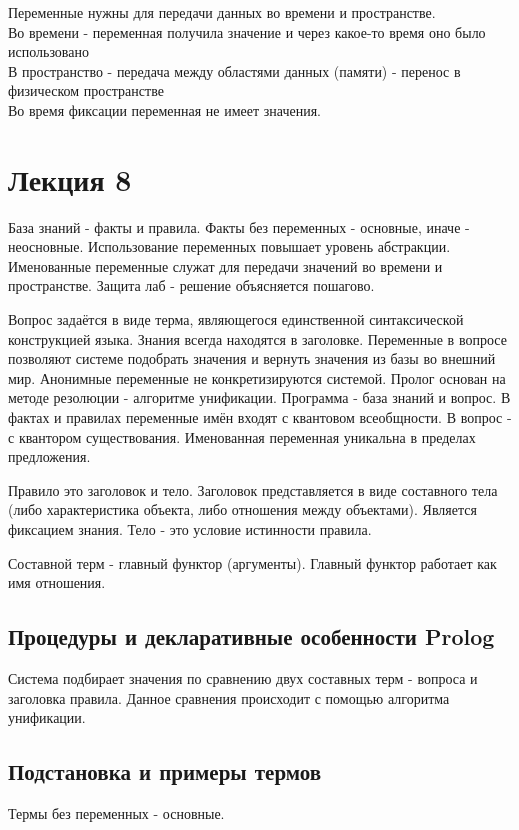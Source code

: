 Переменные нужны для передачи данных во времени и пространстве.\\
Во времени - переменная получила значение и через какое-то время оно было использовано\\
В пространство - передача между областями данных (памяти) - перенос в физическом пространстве\\

Во время фиксации переменная не имеет значения.

\chapter{Лекция 8}
База знаний - факты и правила. Факты без переменных - основные, иначе - неосновные.  Использование переменных повышает уровень абстракции. Именованные переменные служат для передачи значений во времени и пространстве.  Защита лаб - решение объясняется пошагово.

Вопрос задаётся в виде терма, являющегося единственной синтаксической конструкцией языка. Знания всегда находятся в заголовке. Переменные в вопросе позволяют системе подобрать значения и вернуть значения из базы во внешний мир. Анонимные переменные не конкретизируются системой. Пролог основан на методе резолюции - алгоритме унификации.  Программа - база знаний и вопрос. В фактах и правилах переменные имён входят с квантовом всеобщности. В вопрос - с квантором существования.  Именованная переменная уникальна в пределах предложения.

Правило это заголовок и тело. Заголовок представляется в виде составного тела (либо характеристика объекта, либо отношения между объектами). Является фиксацием знания. Тело - это условие истинности правила.

Составной терм - главный функтор (аргументы). Главный функтор работает как имя отношения. 

\section{Процедуры и декларативные особенности Prolog}
Система подбирает значения по сравнению двух составных терм - вопроса и заголовка правила. Данное сравнения происходит с помощью алгоритма унификации.

\section{Подстановка и примеры термов}
Термы без переменных - основные. \\

